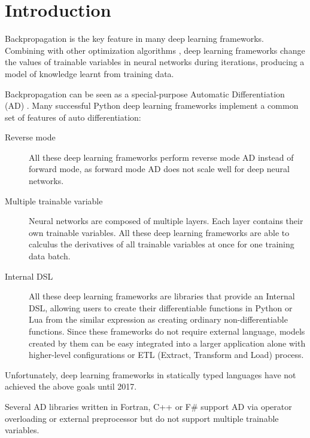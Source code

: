 \section{Introduction}
\label{introduction}

Backpropagation \cite{rumelhart1985learning} is the key feature in many deep learning frameworks. Combining with other optimization algorithms \cite{kingma2014adam, zeiler2012adadelta,duchi2011adaptive}, deep learning frameworks change the values of trainable variables in neural networks during iterations, producing a model of knowledge learnt from training data.

Backpropagation can be seen as a special-purpose Automatic Differentiation (AD) \cite{baydin2015automatic}. Many successful Python deep learning frameworks \cite{tokui2015chainer,google2017eager,paszke2017pytorch,neubig2017dynet} implement a common set of features of auto differentiation:

\begin{description}

  \item[Reverse mode] All these deep learning frameworks perform reverse mode AD instead of forward mode, as forward mode AD does not scale well for deep neural networks.

  \item[Multiple trainable variable] Neural networks are composed of multiple layers. Each layer contains their own trainable variables. All these deep learning frameworks are able to calculus the derivatives of all trainable variables at once for one training data batch.

  \item[Internal DSL \cite{fowler2010domain}] All these deep learning frameworks are libraries that provide an Internal DSL, allowing users to create their differentiable functions in Python or Lua from the similar expression as creating ordinary non-differentiable functions. Since these frameworks do not require external language, models created by them can be easy integrated into a larger application alone with higher-level configurations \cite{chollet2015keras} or ETL (Extract, Transform and Load) process.

\end{description}

Unfortunately, deep learning frameworks in statically typed languages have not achieved the above goals until 2017.

Several AD libraries \cite{bischof1992adifor,griewank1996algorithm,TapenadeRef13,baydin2015diffsharp} written in Fortran, C++ or F\# support AD via operator overloading or external preprocessor but do not support multiple trainable variables.

